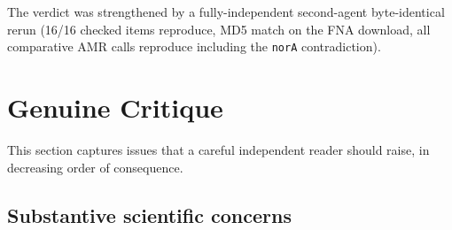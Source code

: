 \documentclass[11pt]{article}
\begin{document}
The verdict was strengthened by a fully-independent second-agent
byte-identical rerun (16/16 checked items reproduce, MD5 match on the
FNA download, all comparative AMR calls reproduce including the
\texttt{norA} contradiction).

\section{Genuine Critique}

This section captures issues that a careful independent reader
should raise, in decreasing order of consequence.

\subsection*{Substantive scientific concerns}
\end{document}
